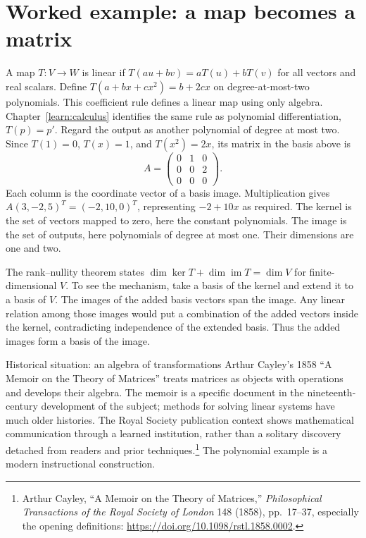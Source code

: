 \section{Worked example: a map becomes a matrix}
A map $T:V\to W$ is linear if
$T(au+bv)=aT(u)+bT(v)$ for all vectors and real scalars. Define
$T(a+bx+cx^2)=b+2cx$ on degree-at-most-two polynomials. This coefficient
rule defines a linear map using only algebra. Chapter~\ref{learn:calculus}
identifies the same rule as polynomial differentiation, $T(p)=p'$. Regard
the output as another polynomial of degree at most two. Since
$T(1)=0$, $T(x)=1$, and $T(x^2)=2x$, its matrix in the basis above is
\[
 A=\begin{pmatrix}0&1&0\\0&0&2\\0&0&0\end{pmatrix}.
\]
Each column is the coordinate vector of a basis image. Multiplication gives
$A(3,-2,5)^T=(-2,10,0)^T$, representing $-2+10x$ as required.
The kernel is the set of vectors mapped to zero, here the constant
polynomials. The image is the set of outputs, here polynomials of degree
at most one. Their dimensions are one and two.

The rank--nullity theorem states
$\dim\ker T+\dim\operatorname{im}T=\dim V$ for finite-dimensional $V$.
To see the mechanism, take a basis of the kernel and extend it to a basis
of $V$. The images of the added basis vectors span the image. Any linear
relation among those images would put a combination of the added vectors
inside the kernel, contradicting independence of the extended basis.
Thus the added images form a basis of the image.

\begin{learningcard}[breakable=false]{Historical situation: an algebra of transformations}
Arthur Cayley's 1858 ``A Memoir on the Theory of Matrices'' treats matrices
as objects with operations and develops their algebra. The memoir is a
specific document in the nineteenth-century development of the subject;
methods for solving linear systems have much older histories. The Royal
Society publication context shows mathematical communication through a
learned institution, rather than a solitary discovery detached from readers
and prior techniques.\footnote{Arthur Cayley, ``A Memoir on the Theory of
Matrices,'' \emph{Philosophical Transactions of the Royal Society of London}
148 (1858), pp.~17--37, especially the opening definitions:
\url{https://doi.org/10.1098/rstl.1858.0002}.}
The polynomial example is a modern instructional construction.
\end{learningcard}

